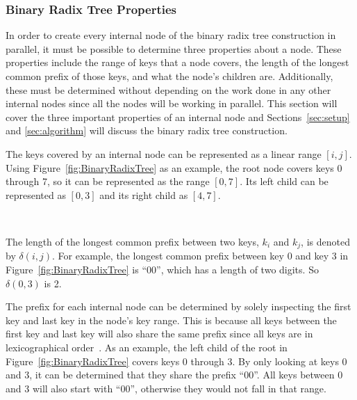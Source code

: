 \documentclass{sig-alternate}
\begin{document}
\subsubsection{Binary Radix Tree Properties}
\label{sec:brtProperties}

In order to create every internal node of the binary radix tree construction in parallel, it must be possible to determine three properties about a node. These properties include the range of keys that a node covers, the length of the longest common prefix of those keys, and what the node's children are. Additionally, these must be determined without depending on the work done in any other internal nodes since all the nodes will be working in parallel. This section will cover the three important properties of an internal node and Sections~\ref{sec:setup} and \ref{sec:algorithm} will discuss the binary radix tree construction.

The keys covered by an internal node can be represented as a linear range $[i,j]$. Using Figure~\ref{fig:BinaryRadixTree} as an example, the root node covers keys 0 through 7, so it can be represented as the range $[0,7]$. Its left child can be represented as $[0,3]$ and its right child as $[4,7]$.

~

The length of the longest common prefix between two keys, $k_{i}$ and $k_{j}$, is denoted by $\delta(i,j)$. For example, the longest common prefix between key 0 and key 3 in Figure~\ref{fig:BinaryRadixTree} is ``00'', which has a length of two digits. So $\delta(0,3)$ is 2.

The prefix for each internal node can be determined by solely inspecting the first key and last key in the node's key range. This is because all keys between the first key and last key will also share the same prefix since all keys are in lexicographical order~\cite{Karras:2012}. As an example, the left child of the root in Figure~\ref{fig:BinaryRadixTree} covers keys 0 through 3. By only looking at keys 0 and 3, it can be determined that they share the prefix ``00''. All keys between 0 and 3 will also start with ``00'', otherwise they would not fall in that range.
\end{document}
